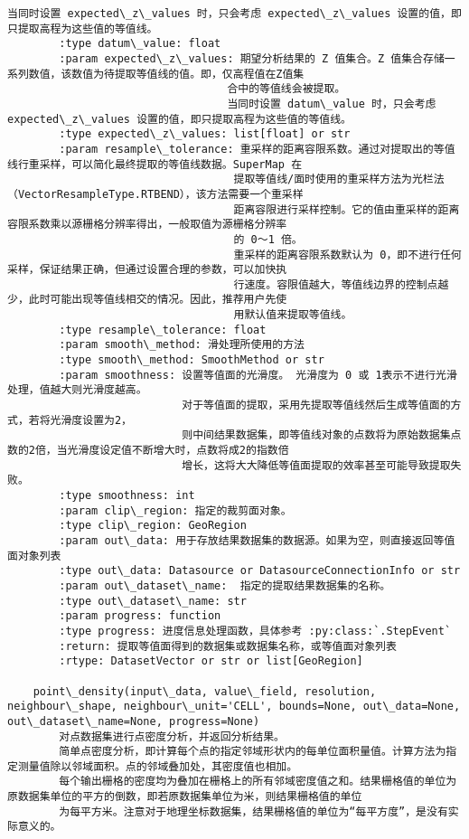 \documentclass[11pt]{article}
\begin{document}
\begin{Verbatim}[commandchars=\\\{\}]
                            当同时设置 expected\_z\_values 时，只会考虑 expected\_z\_values 设置的值，即只提取高程为这些值的等值线。
        :type datum\_value: float
        :param expected\_z\_values: 期望分析结果的 Z 值集合。Z 值集合存储一系列数值，该数值为待提取等值线的值。即，仅高程值在Z值集
                                  合中的等值线会被提取。
                                  当同时设置 datum\_value 时，只会考虑 expected\_z\_values 设置的值，即只提取高程为这些值的等值线。
        :type expected\_z\_values: list[float] or str
        :param resample\_tolerance: 重采样的距离容限系数。通过对提取出的等值线行重采样，可以简化最终提取的等值线数据。SuperMap 在
                                   提取等值线/面时使用的重采样方法为光栏法（VectorResampleType.RTBEND），该方法需要一个重采样
                                   距离容限进行采样控制。它的值由重采样的距离容限系数乘以源栅格分辨率得出，一般取值为源栅格分辨率
                                   的 0～1 倍。
                                   重采样的距离容限系数默认为 0，即不进行任何采样，保证结果正确，但通过设置合理的参数，可以加快执
                                   行速度。容限值越大，等值线边界的控制点越少，此时可能出现等值线相交的情况。因此，推荐用户先使
                                   用默认值来提取等值线。
        :type resample\_tolerance: float
        :param smooth\_method: 滑处理所使用的方法
        :type smooth\_method: SmoothMethod or str
        :param smoothness: 设置等值面的光滑度。 光滑度为 0 或 1表示不进行光滑处理，值越大则光滑度越高。
                           对于等值面的提取，采用先提取等值线然后生成等值面的方式，若将光滑度设置为2，
                           则中间结果数据集，即等值线对象的点数将为原始数据集点数的2倍，当光滑度设定值不断增大时，点数将成2的指数倍
                           增长，这将大大降低等值面提取的效率甚至可能导致提取失败。
        :type smoothness: int
        :param clip\_region: 指定的裁剪面对象。
        :type clip\_region: GeoRegion
        :param out\_data: 用于存放结果数据集的数据源。如果为空，则直接返回等值面对象列表
        :type out\_data: Datasource or DatasourceConnectionInfo or str
        :param out\_dataset\_name:  指定的提取结果数据集的名称。
        :type out\_dataset\_name: str
        :param progress: function
        :type progress: 进度信息处理函数，具体参考 :py:class:`.StepEvent`
        :return: 提取等值面得到的数据集或数据集名称，或等值面对象列表
        :rtype: DatasetVector or str or list[GeoRegion]
    
    point\_density(input\_data, value\_field, resolution, neighbour\_shape, neighbour\_unit='CELL', bounds=None, out\_data=None, out\_dataset\_name=None, progress=None)
        对点数据集进行点密度分析，并返回分析结果。
        简单点密度分析，即计算每个点的指定邻域形状内的每单位面积量值。计算方法为指定测量值除以邻域面积。点的邻域叠加处，其密度值也相加。
        每个输出栅格的密度均为叠加在栅格上的所有邻域密度值之和。结果栅格值的单位为原数据集单位的平方的倒数，即若原数据集单位为米，则结果栅格值的单位
        为每平方米。注意对于地理坐标数据集，结果栅格值的单位为“每平方度”，是没有实际意义的。
        

\end{Verbatim}
\end{document}
